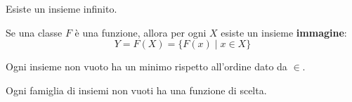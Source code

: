 \begin{axiom}
	Esiste un insieme infinito.
\end{axiom}
\begin{axiom}
	Se una classe $F$ è una funzione, allora per ogni $X$ esiste un insieme \textbf{immagine}:
	\begin{equation*}
		Y=F(X)=\{F(x)\mid x\in X\}
	\end{equation*}
\end{axiom}
\begin{axiom}
	Ogni insieme non vuoto ha un minimo rispetto all'ordine dato da $\in$.
\end{axiom}
\begin{axiom}
	Ogni famiglia di insiemi non vuoti ha una funzione di scelta.
\end{axiom}
